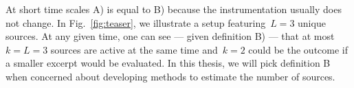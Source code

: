 At short time scales A) is equal to B) because the instrumentation usually does not change. 
In Fig.~\ref{fig:teaser}, we illustrate a setup featuring~$L=3$ unique sources.
At any given time, one can see --- given definition B) --- that at most~$k=L=3$ sources are active at the same time and~$k=2$ could be the outcome if a smaller excerpt would be evaluated.
In this thesis, we will pick definition B when concerned about developing methods to estimate the number of sources.



